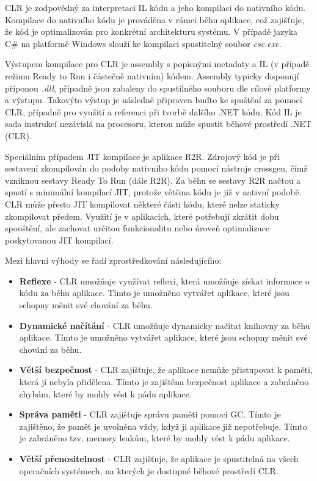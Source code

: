 CLR je zodpovědný za interpretaci IL kódu a jeho kompilaci do nativního kódu. Kompilace do nativního kódu je prováděna v rámci běhu aplikace, což zajišťuje, že kód je optimalizován pro konkrétní architekturu systému. V případě jazyka C\# na platformě Windows slouží ke kompilaci spustitelný soubor \emph{csc.exe}. 

Výstupem kompilace pro CLR je assembly s popisnými metadaty a IL (v případě režimu Ready to Run i částečně nativním) kódem. Assembly typicky disponují příponou \emph{.dll}, případně jsou zabaleny do spustilného souboru dle cílové platformy a výstupu. Takovýto výstup je následně připraven buďto ke spuštění za pomocí CLR, případně pro využití a referenci při tvorbě dalšího .NET kódu. Kód IL je sada instrukcí nezávislá na procesoru, kterou může spustit běhové prostředí .NET (CLR). \cite{Richter2012}

Speciálním případem JIT kompilace je aplikace R2R. Zdrojový kód je při sestavení zkompilován do podoby nativního kódu pomocí nástroje crossgen, čímž vzniknou sestavy Ready To Run (dále R2R). Za běhu se sestavy R2R načtou a spustí s minimální kompilací JIT, protože většina kódu je již v nativní podobě. CLR může přesto JIT kompilovat některé části kódu, které nelze staticky zkompilovat předem. \cite{netdocsr2r} Využití je v aplikacích, které potřebují zkrátit dobu spouštění, ale zachovat určitou funkcionalitu nebo úroveň optimalizace poskytovanou JIT kompilací.

Mezi hlavní výhody se řadí zprostředkování následujícího:

\begin{itemize}
    \item  \textbf{Reflexe} - CLR umožňuje využívat reflexi, která umožňuje získat informace o kódu za běhu aplikace. Tímto je umožněno vytvářet aplikace, které jsou schopny měnit své chování za běhu.
    \item \textbf{Dynamické načítání} - CLR umožňuje dynamicky načítat knihovny za běhu aplikace. Tímto je umožněno vytvářet aplikace, které jsou schopny měnit své chování za běhu.
    \item \textbf{Větší bezpečnost} - CLR zajišťuje, že aplikace nemůže přistupovat k paměti, která jí nebyla přidělena. Tímto je zajištěna bezpečnost aplikace a zabráněno chybám, které by mohly vést k pádu aplikace.
    \item \textbf{Správa paměti} - CLR zajišťuje správu paměti pomocí GC. Tímto je zajištěno, že paměť je uvolněna vždy, když ji aplikace již nepotřebuje. Tímto je zabráněno tzv. memory leakům, které by mohly vést k pádu aplikace.
    \item \textbf{Větší přenositelnost} - CLR zajišťuje, že aplikace je spustitelná na všech operačních systémech, na kterých je dostupné běhové prostředí CLR.
\end{itemize}

